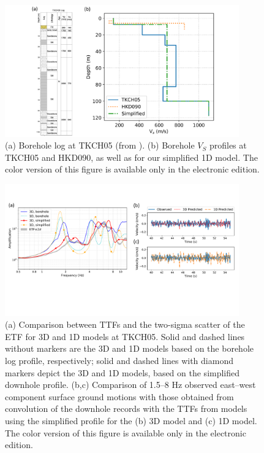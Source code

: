 \clearpage
\begin{figure}[!ht]
  \centering
  \includegraphics[width=0.9\textwidth]{figures/figure_etf_6.pdf}
  \caption{(a) Borehole log at TKCH05 (from \citealt{thompsonTaxonomySiteResponse2012}). (b) Borehole $V_S$ profiles at TKCH05 and HKD090, as well as for our simplified 1D model. The color version of this figure is available only in the electronic edition.}
  \label{fig:etf-6}
\end{figure}

\clearpage
\begin{figure}[!ht]
  \centering
  \includegraphics[width=0.9\textwidth]{figures/figure_etf_7.pdf}
  \caption{(a) Comparison between TTFs and the two-sigma scatter of the ETF for 3D and 1D models at TKCH05. Solid and dashed lines without markers are the 3D and 1D models based on the borehole log profile, respectively; solid and dashed lines with diamond markers depict the 3D and 1D models, based on the simplified downhole profile. (b,c) Comparison of 1.5–8 Hz observed east–west component surface ground motions with those obtained from convolution of the downhole records with the TTFs from models using the simplified profile for the (b) 3D model and (c) 1D model. The color version of this figure is available only in the electronic edition.}
  \label{fig:etf-7}
\end{figure}

